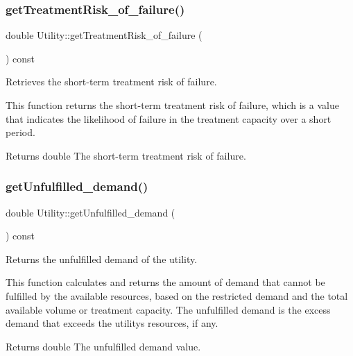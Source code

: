 \subsubsection{\texorpdfstring{get\+Treatment\+Risk\+\_\+of\+\_\+failure()}{getTreatmentRisk\_of\_failure()}}
{\footnotesize\ttfamily double Utility\+::get\+Treatment\+Risk\+\_\+of\+\_\+failure (\begin{DoxyParamCaption}{ }\end{DoxyParamCaption}) const}



Retrieves the short-\/term treatment risk of failure. 

This function returns the short-\/term treatment risk of failure, which is a value that indicates the likelihood of failure in the treatment capacity over a short period.

\begin{DoxyReturn}{Returns}
double The short-\/term treatment risk of failure. 
\end{DoxyReturn}
\mbox{\label{classUtility_a062fd9a622bd9893c142ae56523010dd}} 
\subsubsection{\texorpdfstring{get\+Unfulfilled\+\_\+demand()}{getUnfulfilled\_demand()}}
{\footnotesize\ttfamily double Utility\+::get\+Unfulfilled\+\_\+demand (\begin{DoxyParamCaption}{ }\end{DoxyParamCaption}) const}



Returns the unfulfilled demand of the utility. 

This function calculates and returns the amount of demand that cannot be fulfilled by the available resources, based on the restricted demand and the total available volume or treatment capacity. The unfulfilled demand is the excess demand that exceeds the utility\textquotesingle{}s resources, if any.

\begin{DoxyReturn}{Returns}
double The unfulfilled demand value. 
\end{DoxyReturn}
\mbox{\label{classUtility_aa5fd345867aa8fb5c49d05110d51ca52}} 
